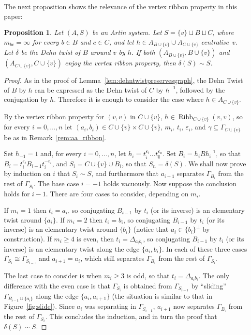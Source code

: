 \documentclass[svgnames]{amsart}
\theoremstyle{plain}
\newtheorem{prop}[thm]{Proposition}
\theoremstyle{definition}
\newcommand{\ribb}[3]{\operatorname{Ribb}_{#1}(#2,#3)}
\begin{document}
\noindent The next proposition shows the relevance of the vertex ribbon property in this paper:

\begin{prop}\label{prop:aa_ribbon_are_twists}
    Let $(A,S)$ be an Artin system. Let $S=\{v\}\sqcup B\sqcup C$, where $m_{bc}=\infty$ for every $b\in B$ and $c\in C$, and let $h\in A_{B\cup\{v\}}\cup A_{C\cup\{v\}}$ centralise~$v$. Let $\delta$ be the Dehn twist of $B$ around $v$ by $h$. 
    If both $(A_{B\cup\{v\}},B\cup \{v\})$ and $(A_{C\cup\{v\}},C\cup \{v\})$ enjoy the vertex ribbon property, then $\delta(S)\sim S$.
\end{prop}

\begin{proof}
As in the proof of Lemma~\ref{lem:dehntwistpreservesgraph}, the Dehn Twist of $B$ by $h$ can be expressed as the Dehn twist of $C$ by $h^{-1}$, followed by the conjugation by $h$. Therefore it is enough to consider the case where $h\in A_{C\cup\{v\}}$. 

By the vertex ribbon property for $(v,v)$ in $C\cup\{v\}$, $h\in\ribb{C\cup\{v\}}{v}{v}$, so for every $i=0,\ldots, n$ let $(a_i,b_i)\in  C\cup\{v\}\times C\cup\{v\}$, $m_i$, $t_i$, $\varepsilon_i$, and $\gamma\subseteq \Gamma_{C\cup \{v\}}$ be as in Remark~\ref{rem:aa_ribbon}. 

Set $h_{-1}=1$ and, for every $i=0,\ldots, n$, let $h_i=t_i^{\varepsilon_i}\ldots t_0^{\varepsilon_0}$. Set $B_i=h_iBh_i^{-1}$, so that $B_i=t_i^{\varepsilon_i} B_{i-1} t_i^{-\varepsilon_i}$, and $S_i=C\cup\{v\}\cup B_i$, so that $S_n=\delta(S)$. We shall now prove by induction on $i$ that $S_i\sim S$, and furthermore that $a_{i+1}$ separates $\Gamma_{B_i}$ from the rest of $\Gamma_{S_i}$. The base case $i=-1$ holds vacuously. Now suppose the conclusion holds for $i-1$. There are four cases to consider, depending on $m_i$.

 If $m_i=1$ then $t_i= a_i$, so conjugating $B_{i-1}$ by $t_i$ (or its inverse) is an elementary twist around $\{a_i\}$. If $m_i=2$ then $t_i= b_i$, so conjugating $B_{i-1}$ by $t_i$ (or its inverse) is an elementary twist around $\{b_i\}$ (notice that $a_i\in \{b_i\}^\bot$ by construction). If $m_i\ge 4$ is even, then $t_i= \Delta_{a_ib_i}$, so conjugating $B_{i-1}$ by $t_i$ (or its inverse) is an elementary twist along the edge $\{a_i,b_i\}$. In each of these three cases $\Gamma_{S_i}\cong \Gamma_{S_{i-1}}$ and $a_{i+1}=a_i$, which still separates $\Gamma_{B_i}$ from the rest of $\Gamma_{S_i}$.

The last case to consider is when $m_i\ge 3$ is odd, so that $t_i= \Delta_{a_ib_i}$. The only difference with the even case is that $\Gamma_{S_i}$ is obtained from $\Gamma_{S_{i-1}}$ by ``sliding'' $\Gamma_{B_{i-1}\cup\{a_i\}}$ along the edge $\{a_i, a_{i+1}\}$ (the situation is similar to that in Figure~\ref{fig:slide}). Since $a_i$ was separating in $\Gamma_{S_{i-1}}$, $a_{i+1}$ now separates $\Gamma_{B_i}$ from the rest of $\Gamma_{S_i}$. This concludes the induction, and in turn the proof that $\delta(S)\sim S$. 
\end{proof}
\end{document}
